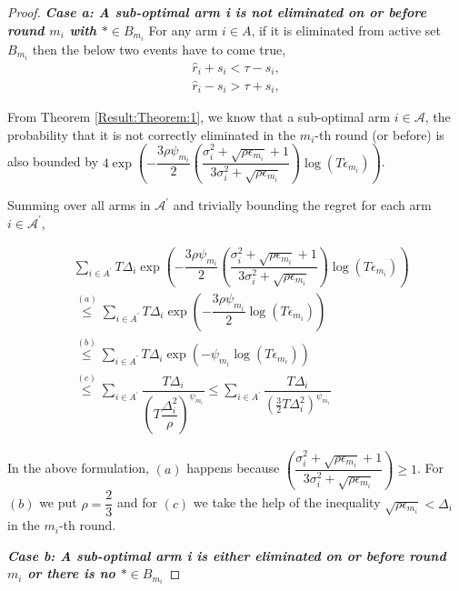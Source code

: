 \begin{proof}
\textbf{\textit{Case a: A sub-optimal arm i is not eliminated on or before round $m_{i}$ with $ * \in B_{m_i}$}}
\newline
For any arm $i\in A$, if it is eliminated from active set $B_{m_{i}}$ then the below two events have to come true,
\begin{align}
\hat{r}_{i} + s_{i} < \tau - s_{i}, \label{eq:armelim-var-casea1}\\
\hat{r}_{i} - s_{i} > \tau + s_{i}, \label{eq:armelim-var-caseb1}
\end{align}

From Theorem \ref{Result:Theorem:1}, we know that a sub-optimal arm $i\in\mathcal{A}$, the probability that it is not correctly eliminated in the $m_i$-th round (or before) is also bounded by $4\exp\left(- \dfrac{3\rho \psi_{m_i}}{2} \left(\dfrac{\sigma_{i}^{2}+\sqrt{\rho\epsilon_{m_{i}}}+1}{3\sigma_{i}^{2}+\sqrt{\rho \epsilon_{m_{i}}}}\right) \log( T\epsilon_{m_{i}}) \right)$.

Summing over all arms in $\mathcal{A}^{'}$ and trivially bounding the regret for each arm $i\in \mathcal{A}^{'}$,

\begin{align*}
&\sum_{i\in A^{'}}T\Delta_{i}\exp\left(- \dfrac{3\rho \psi_{m_i}}{2} \left(\dfrac{\sigma_{i}^{2}+\sqrt{\rho\epsilon_{m_{i}}}+1}{3\sigma_{i}^{2}+\sqrt{\rho \epsilon_{m_{i}}}}\right) \log( T\epsilon_{m_{i}}) \right)\\
&\overset{(a)}{\le}  \sum_{i\in A^{'}}T\Delta_{i} \exp\left(- \dfrac{3\rho \psi_{m_i}}{2} \log( T\epsilon_{m_{i}}) \right)\\
&\overset{(b)}{\le}  \sum_{i\in A^{'}}T\Delta_{i} \exp\left(-\psi_{m_i} \log( T\epsilon_{m_{i}}) \right)\\
&\overset{(c)}{\le}  \sum_{i\in A^{'}}\dfrac{T\Delta_{i}}{( T\dfrac{\Delta_i^{2}}{\rho})^{\psi_{m_i}}} \leq \sum_{i\in A^{'}}\dfrac{T\Delta_{i}}{( \frac{3}{2} T\Delta_i^{2})^{\psi_{m_i}}}
\end{align*}

In the above formulation, $(a)$ happens because  $\left(\dfrac{\sigma_{i}^{2}+\sqrt{\rho\epsilon_{m_{i}}}+1}{3\sigma_{i}^{2}+\sqrt{\rho \epsilon_{m_{i}}}}\right) \geq 1$. For $(b)$ we put $\rho=\dfrac{2}{3}$ and for $(c)$ we take the help of the inequality $\sqrt{\rho \epsilon_{m_i}} < \Delta_i$ in the $m_i$-th round.

\textbf{\textit{Case b: A sub-optimal arm i is either eliminated on or before round $m_{i}$ or there is no $ * \in B_{m_i}$}}



\end{proof}
